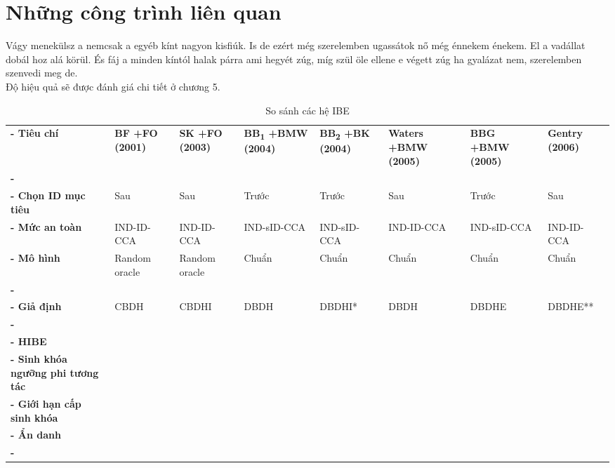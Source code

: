 \documentclass[class=report, crop=false]{standalone}
\begin{document}
	\section{Những công trình liên quan}
		Vágy menekülsz a nemcsak a egyéb kínt nagyon kisfiúk. Is de ezért még szerelemben ugassátok nő még énnekem énekem. El a vadállat dobál hoz alá körül. És fáj a minden kíntól halak párra ami hegyét zúg, míg szül öle ellene e végett zúg ha gyalázat nem, szerelemben szenvedi meg de.\\[\baselineskip]
		Độ hiệu quả sẽ được đánh giá chi tiết ở chương 5.
		\newpage
		\small
		\begin{longtabu}{| >{\bfseries\centering}p{2cm} X[c] X[c] X[c] X[c] X[c] X[c] X[c] |}
			\tabucline[4pt]-
			Tiêu chí &
			\bfseries BF +FO \newline\newline (2001) &
			\bfseries SK +FO \newline\newline (2003) &
			\bfseries BB\textsubscript{1} +BMW (2004) &
			\bfseries BB\textsubscript{2} +BK \newline\newline (2004) &
			\bfseries Waters +BMW (2005) &
			\bfseries BBG +BMW (2005) &
			\bfseries Gentry \newline\newline (2006) \\
			\tabucline[2pt]-
			 \\
			\tabucline[1pt]-
			Chọn ID mục tiêu & Sau & Sau & Trước & Trước & Sau & Trước & Sau \\
			\tabucline[1pt]-
			Mức an toàn & IND-ID-CCA & IND-ID-CCA & IND-sID-CCA & IND-sID-CCA & IND-ID-CCA & IND-sID-CCA & IND-ID-CCA \\
			\tabucline[1pt]-
			Mô hình & Random oracle & Random oracle & Chuẩn & Chuẩn & Chuẩn & Chuẩn & Chuẩn \\
			\tabucline[2pt]-
			 \\
			\tabucline[1pt]-
			Giả định & CBDH & CBDHI & DBDH & DBDHI* & DBDH & DBDHE & DBDHE** \\
			\tabucline[2pt]-
			 \\
			\tabucline[1pt]-
			HIBE & \checkmark & & \checkmark & & \checkmark & \checkmark & \\
			\tabucline[1pt]-
			Sinh khóa ngưỡng phi tương tác & \checkmark & & \checkmark & & \checkmark & \checkmark & \\
			\tabucline[1pt]-
			Giới hạn cấp sinh khóa & & & & & & \checkmark & \\
			\tabucline[1pt]-
			Ẩn danh & & & & & & & \checkmark \\
			\tabucline[4pt]-
			\caption{So sánh các hệ IBE}
		\end{longtabu}
\end{document}
